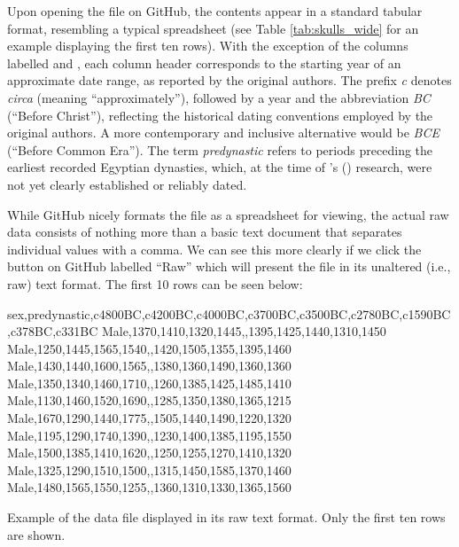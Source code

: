 Upon opening the file on GitHub, the contents appear in a standard tabular format, resembling a typical spreadsheet (see Table \ref{tab:skulls_wide} for an example displaying the first ten rows). With the exception of the columns labelled  and , each column header corresponds to the starting year of an approximate date range, as reported by the original authors. The prefix \textit{c} denotes \textit{circa} (meaning ``approximately''), followed by a year and the abbreviation \textit{BC} (``Before Christ''), reflecting the historical dating conventions employed by the original authors. A more contemporary and inclusive alternative would be \textit{BCE} (``Before Common Era''). The term \textit{predynastic} refers to periods preceding the earliest recorded Egyptian dynasties, which, at the time of \citeauthor{Thomson1905}'s (\citeyear{Thomson1905}) research, were not yet clearly established or reliably dated.

\vspace{1em}



While GitHub nicely formats the file as a spreadsheet for viewing, the actual raw data consists of nothing more than a basic text document that separates individual values with a comma. We can see this more clearly if we click the button on GitHub labelled ``Raw'' which will present the file in its unaltered (i.e., raw) text format. The first 10 rows can be seen below:

\vspace{1em}

\begin{listing}[H]
\begin{raw}
sex,predynastic,c4800BC,c4200BC,c4000BC,c3700BC,c3500BC,c2780BC,c1590BC,c378BC,c331BC
Male,1370,1410,1320,1445,,1395,1425,1440,1310,1450
Male,1250,1445,1565,1540,,1420,1505,1355,1395,1460
Male,1430,1440,1600,1565,,1380,1360,1490,1360,1360
Male,1350,1340,1460,1710,,1260,1385,1425,1485,1410
Male,1130,1460,1520,1690,,1285,1350,1380,1365,1215
Male,1670,1290,1440,1775,,1505,1440,1490,1220,1320
Male,1195,1290,1740,1390,,1230,1400,1385,1195,1550
Male,1500,1385,1410,1620,,1250,1255,1270,1410,1320
Male,1325,1290,1510,1500,,1315,1450,1585,1370,1460
Male,1480,1565,1550,1255,,1360,1310,1330,1365,1560
\end{raw}
\caption*{Example of the  data file displayed in its raw text format. Only the first ten rows are shown.}
\end{listing}

